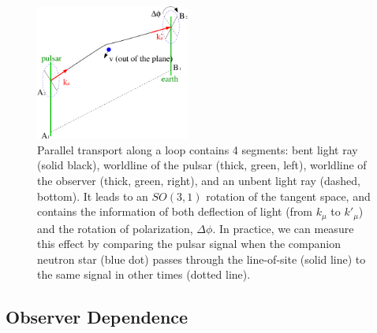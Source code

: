 \documentclass[aps,showpacs,twocolumn,floats,prd,superscriptaddress,nofootinbib]{revtex4-1}
\begin{document}
\begin{figure}
\includegraphics[width=0.45\textwidth]{loop.pdf}
\caption{\label{fig:loop}
Parallel transport along a loop contains 4 segments: bent light ray (solid black), worldline of the pulsar (thick, green, left), worldline of the observer (thick, green, right), and an unbent light ray (dashed, bottom). It leads to an $SO(3,1)$ rotation of the tangent space, and contains the information of both deflection of light (from $k_\mu$ to $k'_\mu$) and the rotation of polarization, $\Delta\phi$. In practice, we can measure this effect by comparing the pulsar signal when the companion neutron star (blue dot) passes through the line-of-site (solid line) to the same signal in other times (dotted line).
}
\end{figure}

\subsection{Observer Dependence}
\end{document}
